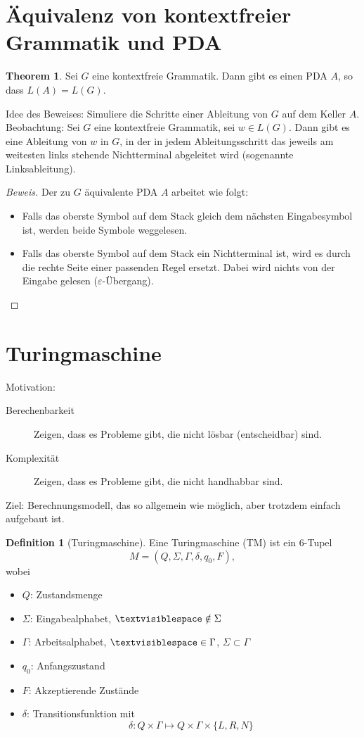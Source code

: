 \documentclass[11pt]{article} %
\theoremstyle{definition}
\newtheorem{definition}{Definition}
\newtheorem{theorem}{Theorem}
\begin{document}
\section{Äquivalenz von kontextfreier Grammatik und PDA}

\begin{theorem}
Sei $G$ eine kontextfreie Grammatik. Dann gibt es einen PDA $A$, so dass $L(A) = L(G)$.
\end{theorem}

Idee des Beweises: Simuliere die Schritte einer Ableitung von $G$ auf dem Keller $A$. Beobachtung: Sei $G$ eine kontextfreie Grammatik, sei $w \in L(G)$. Dann gibt es eine Ableitung von $w$ in $G$, in der in jedem Ableitungsschritt das jeweils am weitesten links stehende Nichtterminal abgeleitet wird (sogenannte Linksableitung).

\begin{proof}[Beweis]
Der zu $G$ äquivalente PDA $A$ arbeitet wie folgt:
\begin{itemize}
\item Falls das oberste Symbol auf dem Stack gleich dem nächsten Eingabesymbol ist, werden beide Symbole weggelesen.
\item Falls das oberste Symbol auf dem Stack ein Nichtterminal ist, wird es durch die rechte Seite einer passenden Regel ersetzt. Dabei wird nichts von der Eingabe gelesen ($\varepsilon$-Übergang).
\end{itemize}
\end{proof}


\section{Turingmaschine}

Motivation:
\begin{description}
\item[Berechenbarkeit] Zeigen, dass es Probleme gibt, die nicht lösbar (entscheidbar) sind.
\item[Komplexität] Zeigen, dass es Probleme gibt, die nicht handhabbar sind.
\end{description}

Ziel:
Berechnungsmodell, das so allgemein wie möglich, aber trotzdem einfach aufgebaut ist.

\begin{definition}[Turingmaschine]
Eine Turingmaschine (TM) ist ein 6-Tupel
\[
M = (Q, \Sigma, \Gamma, \delta, q_0, F),
\]
wobei
\begin{itemize}
\item $Q$: Zustandsmenge
\item $\Sigma$: Eingabealphabet, $\textvisiblespace \notin \Sigma$
\item $\Gamma$: Arbeitsalphabet, $\textvisiblespace \in \Gamma$, $\Sigma \subset \Gamma$
\item $q_0$: Anfangszustand
\item $F$: Akzeptierende Zustände
\item $\delta$: Transitionsfunktion mit
\[
\delta: Q\times \Gamma \mapsto Q \times \Gamma \times \{L,R,N\}
\]
\end{itemize}

\end{definition}
\end{document}
